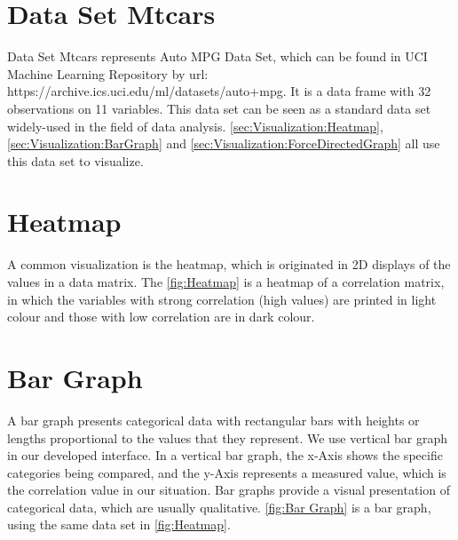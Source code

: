 \section{Data Set Mtcars}
\label{sec:Visualization:mtcars}
Data Set Mtcars represents Auto MPG Data Set, which can be found in UCI Machine Learning Repository by url: https://archive.ics.uci.edu/ml/datasets/auto+mpg. It is a data frame with 32 observations on 11 variables. This data set can be seen as a standard data set widely-used in the field of data analysis. \autoref{sec:Visualization:Heatmap}, \autoref{sec:Visualization:BarGraph} and \autoref{sec:Visualization:ForceDirectedGraph} all use this data set to visualize.

\section{Heatmap}
\label{sec:Visualization:Heatmap}
A common visualization is the heatmap\cite{heatmap}, which is originated in 2D displays of the values in a data matrix. The \autoref{fig:Heatmap} is a heatmap of a correlation matrix, in which the variables with strong correlation (high values) are printed in light colour and those with low correlation are in dark colour.\\

\section{Bar Graph}
\label{sec:Visualization:BarGraph}
A bar graph\cite{bar} presents categorical data with rectangular bars with heights or lengths proportional to the values that they represent. We use vertical bar graph in our developed interface. In a vertical bar graph, the x-Axis shows the specific categories being compared, and the y-Axis represents a measured value, which is the correlation value in our situation. Bar graphs provide a visual presentation of categorical data, which are usually qualitative. \autoref{fig:Bar Graph} is a bar graph, using the same data set in \autoref{fig:Heatmap}.\\


